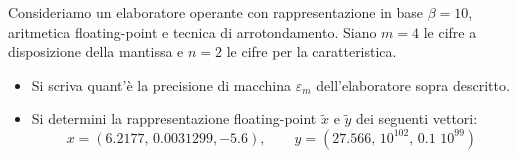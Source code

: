 Consideriamo un elaboratore operante con rappresentazione in base
$\beta=10$, aritmetica floating-point e tecnica di
arrotondamento. Siano  $m=4$ le cifre a disposizione della
mantissa e $n=2$ le cifre per la  caratteristica.


\begin{itemize}
 \item Si scriva
quant'\`{e} la precisione di macchina $\varepsilon_m$
dell'elaboratore sopra descritto.
\item
Si determini la rappresentazione floating-point $\widetilde{x}$ e
$\widetilde{y}$ dei seguenti vettori:
\[ x=(6.2177,\,  0.0031299, -5.6), \quad \quad  y=(27.566, \, 10^{102},\,  0.1\,\,10^{99}) \]
\end{itemize}
